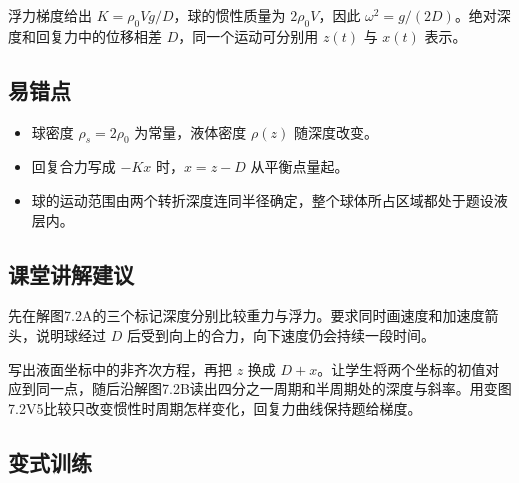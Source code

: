 \documentclass[UTF8,fontset=fandol,a4paper,11pt]{ctexart}
\begin{document}
浮力梯度给出 $K=\rho_0Vg/D$，球的惯性质量为 $2\rho_0V$，因此 $\omega^2=g/(2D)$。绝对深度和回复力中的位移相差 $D$，同一个运动可分别用 $z(t)$ 与 $x(t)$ 表示。




\subsection*{易错点}

\begin{itemize}
\item 球密度 $\rho_s=2\rho_0$ 为常量，液体密度 $\rho(z)$ 随深度改变。
\item 回复合力写成 $-Kx$ 时，$x=z-D$ 从平衡点量起。
\item 球的运动范围由两个转折深度连同半径确定，整个球体所占区域都处于题设液层内。
\end{itemize}




\subsection*{课堂讲解建议}

先在解图7.2A的三个标记深度分别比较重力与浮力。要求同时画速度和加速度箭头，说明球经过 $D$ 后受到向上的合力，向下速度仍会持续一段时间。

写出液面坐标中的非齐次方程，再把 $z$ 换成 $D+x$。让学生将两个坐标的初值对应到同一点，随后沿解图7.2B读出四分之一周期和半周期处的深度与斜率。用变图7.2V5比较只改变惯性时周期怎样变化，回复力曲线保持题给梯度。




\subsection*{变式训练}
\end{document}
